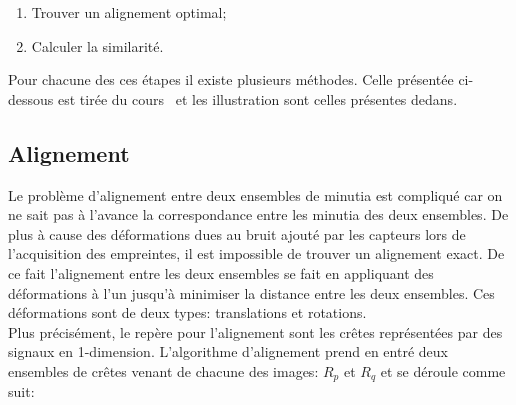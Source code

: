 \documentclass{report}
\begin{document}
\begin{enumerate}
\item Trouver un alignement optimal;
\item Calculer la similarité.
\end{enumerate}

Pour chacune des ces étapes il existe plusieurs méthodes. Celle
présentée ci-dessous est tirée du cours~\cite{finger.00.jain} et les
illustration sont celles présentes dedans.

\subsection{Alignement}

Le problème d'alignement entre deux ensembles de minutia est
compliqué car on ne sait pas à l'avance la correspondance entre les
minutia des deux ensembles. De plus à cause des déformations dues au
bruit ajouté par les capteurs lors de l'acquisition des empreintes, il
est impossible de trouver un alignement exact. De ce fait l'alignement
entre les deux ensembles se fait en appliquant des déformations à l'un
jusqu'à minimiser la distance entre les deux ensembles. Ces
déformations sont de deux types: translations et rotations.\\
Plus précisément, le repère pour l'alignement sont les crêtes
représentées par des signaux en 1-dimension. L'algorithme d'alignement
prend en entré deux ensembles de crêtes venant de chacune des images:
$R_p$ et $R_q$ et se déroule comme suit:
\end{document}
